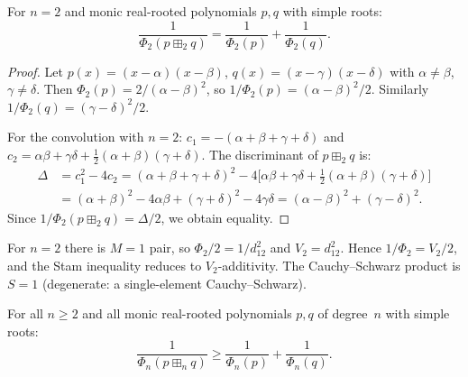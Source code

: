 \begin{theorem}[The $n = 2$ case: exact equality]
\label{thm:p4-n2}
For $n = 2$ and monic real-rooted polynomials $p, q$ with simple roots:
\[
  \frac{1}{\Phi_2(p \boxplus_2 q)} = \frac{1}{\Phi_2(p)} + \frac{1}{\Phi_2(q)}.
\]
\end{theorem}

\begin{proof}
Let $p(x) = (x-\alpha)(x-\beta)$, $q(x) = (x-\gamma)(x-\delta)$ with
$\alpha \neq \beta$, $\gamma \neq \delta$.
Then $\Phi_2(p) = 2/(\alpha-\beta)^2$, so
$1/\Phi_2(p) = (\alpha-\beta)^2/2$. Similarly $1/\Phi_2(q) = (\gamma-\delta)^2/2$.

For the convolution with $n = 2$: $c_1 = -(\alpha+\beta+\gamma+\delta)$ and
$c_2 = \alpha\beta + \gamma\delta + \frac{1}{2}(\alpha+\beta)(\gamma+\delta)$.
The discriminant of $p \boxplus_2 q$ is:
\begin{align*}
\Delta &= c_1^2 - 4c_2
= (\alpha+\beta+\gamma+\delta)^2 - 4\bigl[\alpha\beta + \gamma\delta + \tfrac{1}{2}(\alpha+\beta)(\gamma+\delta)\bigr] \\
&= (\alpha+\beta)^2 - 4\alpha\beta + (\gamma+\delta)^2 - 4\gamma\delta
= (\alpha - \beta)^2 + (\gamma - \delta)^2.
\end{align*}
Since $1/\Phi_2(p \boxplus_2 q) = \Delta/2$, we obtain equality.
\end{proof}

\begin{remark}[Why $n = 2$ is special]
\label{rem:p4-n2-eq}
For $n = 2$ there is $M = 1$ pair, so $\Phi_2/2 = 1/d_{12}^2$ and
$V_2 = d_{12}^2$. Hence $1/\Phi_2 = V_2/2$, and the Stam inequality
reduces to $V_2$-additivity. The Cauchy--Schwarz product is $S = 1$
(degenerate: a single-element Cauchy--Schwarz).
\end{remark}

\begin{theorem}
\label{thm:p4-main}
For all $n \geq 2$ and all monic real-rooted polynomials $p, q$ of
degree~$n$ with simple roots:
\begin{equation}\label{eq:p4-main-ineq}
  \frac{1}{\Phi_n(p \boxplus_n q)} \geq \frac{1}{\Phi_n(p)} + \frac{1}{\Phi_n(q)}.
\end{equation}
\end{theorem}

